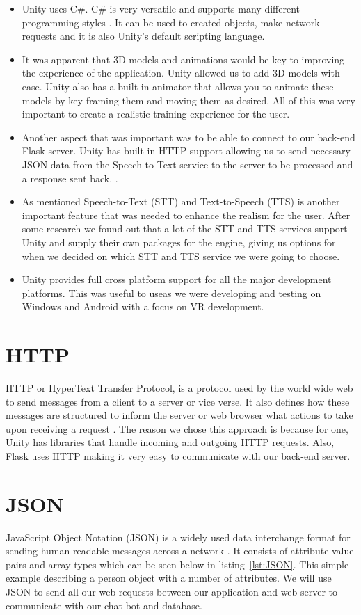 \begin{itemize}
  \item Unity uses C\#. C\# is very versatile and supports many different programming styles \cite{csharp}. It can be used to created objects, make network requests and it is also Unity's default scripting language.
  \item It was apparent that 3D models and animations would be key to improving the experience of the application. Unity allowed us to add 3D models with ease. Unity also has a built in animator that allows you to animate these models by key-framing them and moving them as desired. All of this was very important to create a realistic training experience for the user.
  \item Another aspect that was important was to be able to connect to our back-end Flask server. Unity has built-in HTTP support allowing us to send necessary JSON data from the Speech-to-Text service to the server to be processed and a response sent back. \cite{unitywebrequest}.
  \item As mentioned Speech-to-Text (STT) and Text-to-Speech (TTS) is another important feature that was needed to enhance the realism for the user. After some research we found out that a lot of the STT and TTS services support Unity and supply their own packages for the engine, giving us options for when we decided on which STT and TTS service we were going to choose.
  \item Unity provides full cross platform support for all the major development platforms. This was useful to useas we were developing and testing on Windows and Android with a focus on VR development.
\end{itemize}

\section{HTTP}
HTTP or HyperText Transfer Protocol, is a protocol used by the world wide web to send messages from a client to a server or vice verse. It also defines how these messages are structured to inform the server or web browser what actions to take upon receiving a request \cite{rescorla2000http}. The reason we chose this approach is because for one, Unity has libraries that handle incoming and outgoing HTTP requests. Also, Flask uses HTTP making it very easy to communicate with our back-end server.

\section{JSON}
JavaScript Object Notation (JSON) is a widely used data interchange format for sending human readable messages across a network \cite{chen2014javascript}. It consists of attribute value pairs and array types which can be seen below in listing~\ref{lst:JSON}. This simple example describing a person object with a number of attributes. We will use JSON to send all our web requests between our application and web server to communicate with our chat-bot and database.

